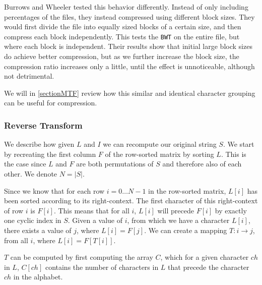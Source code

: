 \documentclass{article}
\begin{document}
Burrows and Wheeler tested this behavior differently. Instead of only including percentages of the files, they instead compressed using different block sizes. They would first divide the file into equally sized blocks of a certain size, and then compress each block independently. This tests the \texttt{BWT} on the entire file, but where each block is independent. Their results show that initial large block sizes do achieve better compression, but as we further increase the block size, the compression ratio increases only a little, until the effect is unnoticeable, although not detrimental.

We will in \cref{sectionMTF} review how this similar and identical character grouping can be useful for compression.

\subsubsection{Reverse Transform}
We describe how given \(L\) and \(I\) we can recompute our original string \(S\). We start by recreating the first column \(F\) of the row-sorted matrix by sorting \(L\). This is the case since \(L\) and \(F\) are both permutations of \(S\) and therefore also of each other. We denote \(N = |S|\).

Since we know that for each row \(i=0 \dots N - 1\) in the row-sorted matrix, \(L[i]\) has been sorted according to its right-context. The first character of this right-context of row \(i\) is \(F[i]\). This means that for all \(i\), \(L[i]\) will precede \(F[i]\) by exactly one cyclic index in \(S\).
Given a value of \(i\), from which we have a character \(L[i]\), there exists a value of \(j\), where \(L[i] = F[j]\). We can create a mapping \(T: i \rightarrow j\), from all \(i\), where \(L[i] = F[T[i]]\).

\(T\) can be computed by first computing the array \(C\), which for a given character \(ch\) in \(L\), \(C[ch]\) contains the number of characters in \(L\) that precede the character \(ch\) in the alphabet.
\end{document}
